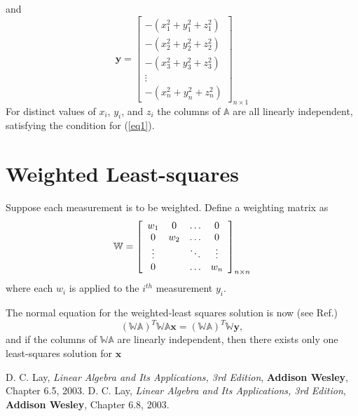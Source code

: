 \documentclass[11pt,letterpaper,onecolumn]{IEEEtran}
\begin{document}
and 
\begin{equation}
\mathbf{y}=
\begin{bmatrix}
-\left(x_1^2+y_1^2+z_1^2\right)\\
-\left(x_2^2+y_2^2+z_2^2\right)\\
-\left(x_3^2+y_3^2+z_3^2\right)\\
\vdots\\
-\left(x_n^2+y_n^2+z_n^2\right)
\end{bmatrix}_{ n \times 1}
\end{equation}
For distinct values of $x_i$, $y_i$, and $z_i$ the columns of $\mathbb{A}$ are all linearly independent, satisfying the condition for (\ref{eq1}).

\section{Weighted Least-squares}
Suppose each measurement is to be weighted. Define a weighting matrix as 
\begin{equation}
	\mathbb{W} = 
	\begin{bmatrix}
		\begin{array}{c c c c}
			w_1 &0  & \ldots &0 \\
			0 &w_2 & \ldots &0 \\
			\vdots &  & \ddots & \vdots \\
			0 & & \ldots & w_n \\
		\end{array}
	\end{bmatrix}_{n \times n}
\end{equation}
where each $w_i$ is applied to the $i^{th}$ measurement $y_i$.

The normal equation for the weighted-least squares solution is now (see Ref.\cite{ref2})
\begin{equation}
	\left(\mathbb{W}\mathbb{A}\right)^T \mathbb{W}\mathbb{A} \mathbf{x}= \left(\mathbb{W}\mathbb{A}\right)^T \mathbb{W} \mathbf{y}, 
\end{equation}
and if the columns of $\mathbb{W}\mathbb{A}$ are linearly independent, then there   exists only one least-squares solution for $\mathbf{x}$
\begin{thebibliography}{IEEEtran}
	D. C. Lay,								%
	\textit{Linear Algebra and Its Applications, 3rd Edition},				%
	\textbf{Addison Wesley},				%
	Chapter 6.5,								%
	2003. 									%
	D. C. Lay,								%
	\textit{Linear Algebra and Its Applications, 3rd Edition},				%
	\textbf{Addison Wesley},				%
	Chapter 6.8,								%
	2003.
%	
\end{thebibliography}
\end{document}
